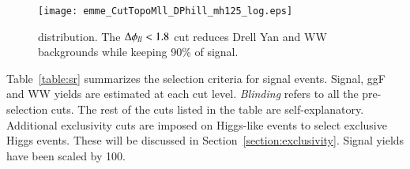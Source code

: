 \begin{figure}[!h]
\centering
	\texttt{[image: emme\_CutTopoMll\_DPhill\_mh125\_log.eps]}\\
\caption{\dfll distribution. The $\Delta\phi_{ll}<1.8$ cut reduces Drell Yan and WW backgrounds while 
keeping 90\% of signal.}
\label{fig:dphill}
\end{figure}

\par Table~\ref{table:sr} summarizes the selection criteria for signal events. Signal, ggF and WW yields 
are estimated at each cut level. {\it Blinding} refers to all the pre-selection cuts. The rest of the cuts
listed in the table are self-explanatory. Additional exclusivity cuts are imposed on Higgs-like events to 
select exclusive Higgs events. These will be discussed in Section~\ref{section:exclusivity}. Signal yields 
have been scaled by 100.

\begin{table}
\begin{center}
\caption{Signal selection criteria. {\it Blinding} refers to all the pre-selection cuts. Yields are normalized to 20.3\ifb and 
signal is scaled by a normalization/scale factor (NF) of 100.}
\label{table:sr}
\end{center}
\end{table}
